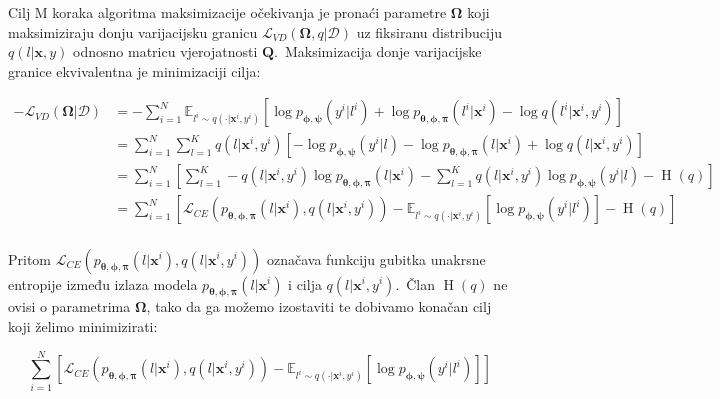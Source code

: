 \documentclass[diplomskirad]{fer}
\begin{document}
Cilj M koraka algoritma maksimizacije očekivanja je pronaći parametre $\bm{\Omega}$ koji maksimiziraju donju varijacijsku granicu $\mathcal{L}_{VD}(\bm{\Omega}, q | \mathcal{D})$ uz fiksiranu distribuciju $q(l | \bm{x}, y)$ odnosno matricu vjerojatnosti $\bm{Q}$.\ 
Maksimizacija donje varijacijske granice ekvivalentna je minimizaciji cilja:

\begin{equation}
  \begin{aligned}
    -\mathcal{L}_{VD}(\bm{\Omega}|\mathcal{D}) &= -\sum_{i=1}^{N} \mathbb{E}_{l^i \sim q(\cdot | \bm{x}^i, y^i)} \left[\log p_{\bm{\phi}, \bm{\psi}}(y^i | l^i) + \log p_{\bm{\theta}, \bm{\phi}, \bm{\pi}}(l^i | \bm{x}^i) - \log q(l^i | \bm{x}^i, y^i) \right] \\
                                               &= \sum_{i=1}^{N} \sum_{l=1}^{K} q(l | \bm{x}^i, y^i) \left[-\log p_{\bm{\phi}, \bm{\psi}}(y^i | l) - \log p_{\bm{\theta}, \bm{\phi}, \bm{\pi}}(l | \bm{x}^i) + \log q(l | \bm{x}^i, y^i) \right] \\
                                               &= \sum_{i=1}^{N} \left[ \sum_{l=1}^{K} -q(l | \bm{x}^i, y^i) \log p_{\bm{\theta}, \bm{\phi}, \bm{\pi}}(l | \bm{x}^i) - \sum_{l=1}^{K} q(l | \bm{x}^i, y^i) \log p_{\bm{\phi}, \bm{\psi}}(y^i | l) - \operatorname{H}(q) \right] \\
                                               &= \sum_{i=1}^{N} \left[ \mathcal{L}_{CE} (p_{\bm{\theta}, \bm{\phi}, \bm{\pi}}(l | \bm{x}^i), q(l | \bm{x}^i, y^i)) - \mathbb{E}_{l^i \sim q(\cdot | \bm{x}^i, y^i)} \left[ \log p_{\bm{\phi}, \bm{\psi}}(y^i | l^i) \right] - \operatorname{H}(q) \right] \\
  \end{aligned}
  \label{eq:vibe_m_step_init}
\end{equation}

Pritom $\mathcal{L}_{CE} (p_{\bm{\theta}, \bm{\phi}, \bm{\pi}}(l | \bm{x}^i), q(l | \bm{x}^i, y^i))$ označava funkciju gubitka unakrsne entropije između izlaza modela $p_{\bm{\theta}, \bm{\phi}, \bm{\pi}}(l | \bm{x}^i)$ i cilja $q(l | \bm{x}^i, y^i)$.\ 
Član $\operatorname{H}(q)$ ne ovisi o parametrima $\bm{\Omega}$, tako da ga možemo izostaviti te dobivamo konačan cilj koji želimo minimizirati:

\begin{equation}
  \sum_{i=1}^{N} \left[ \mathcal{L}_{CE} (p_{\bm{\theta}, \bm{\phi}, \bm{\pi}}(l | \bm{x}^i), q(l | \bm{x}^i, y^i)) - \mathbb{E}_{l^i \sim q(\cdot | \bm{x}^i, y^i)} \left[ \log p_{\bm{\phi}, \bm{\psi}}(y^i | l^i) \right] \right]
  \label{eq:vibe_m_step_final}
\end{equation}
\end{document}
